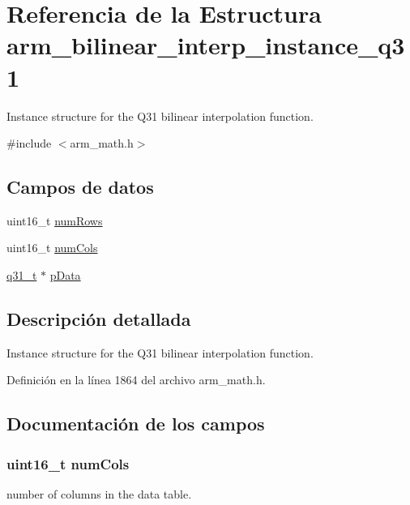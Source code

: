 \hypertarget{structarm__bilinear__interp__instance__q31}{}\section{Referencia de la Estructura arm\+\_\+bilinear\+\_\+interp\+\_\+instance\+\_\+q31}
\label{structarm__bilinear__interp__instance__q31}


Instance structure for the Q31 bilinear interpolation function.  




{\ttfamily \#include $<$arm\+\_\+math.\+h$>$}

\subsection*{Campos de datos}
\begin{DoxyCompactItemize}
\item 
uint16\+\_\+t \hyperlink{structarm__bilinear__interp__instance__q31_a1bcf80ccdc2acc29198f1592ae300390}{num\+Rows}
\item 
uint16\+\_\+t \hyperlink{structarm__bilinear__interp__instance__q31_a4bb5ec0d13eb4c9cf887aa8366a44117}{num\+Cols}
\item 
\hyperlink{arm__math_8h_adc89a3547f5324b7b3b95adec3806bc0}{q31\+\_\+t} $\ast$ \hyperlink{structarm__bilinear__interp__instance__q31_ad296f76577326ff280726323536eed6d}{p\+Data}
\end{DoxyCompactItemize}


\subsection{Descripción detallada}
Instance structure for the Q31 bilinear interpolation function. 

Definición en la línea 1864 del archivo arm\+\_\+math.\+h.



\subsection{Documentación de los campos}
\subsubsection[{\texorpdfstring{num\+Cols}{numCols}}]{\setlength{\rightskip}{0pt plus 5cm}uint16\+\_\+t num\+Cols}\hypertarget{structarm__bilinear__interp__instance__q31_a4bb5ec0d13eb4c9cf887aa8366a44117}{}\label{structarm__bilinear__interp__instance__q31_a4bb5ec0d13eb4c9cf887aa8366a44117}
number of columns in the data table. 

